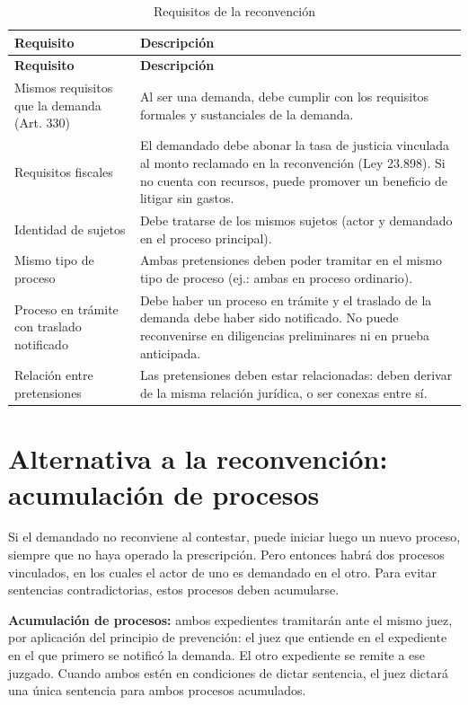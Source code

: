 \documentclass[12pt,oneside]{book}
\begin{document}
\begin{longtable}{p{} p{}}
\caption{Requisitos de la reconvención} \\
\toprule
\textbf{Requisito} & \textbf{Descripción} \\
\midrule
\endfirsthead
\toprule
\textbf{Requisito} & \textbf{Descripción} \\
\midrule
\endhead
Mismos requisitos que la demanda (Art. 330) & Al ser una demanda, debe cumplir con los requisitos formales y sustanciales de la demanda. \\
Requisitos fiscales & El demandado debe abonar la tasa de justicia vinculada al monto reclamado en la reconvención (Ley 23.898). Si no cuenta con recursos, puede promover un beneficio de litigar sin gastos. \\
Identidad de sujetos & Debe tratarse de los mismos sujetos (actor y demandado en el proceso principal). \\
Mismo tipo de proceso & Ambas pretensiones deben poder tramitar en el mismo tipo de proceso (ej.: ambas en proceso ordinario). \\
Proceso en trámite con traslado notificado & Debe haber un proceso en trámite y el traslado de la demanda debe haber sido notificado. No puede reconvenirse en diligencias preliminares ni en prueba anticipada. \\
Relación entre pretensiones & Las pretensiones deben estar relacionadas: deben derivar de la misma relación jurídica, o ser conexas entre sí. \\
\bottomrule
\end{longtable}

\section{Alternativa a la reconvención: acumulación de procesos}

Si el demandado no reconviene al contestar, puede iniciar luego un nuevo proceso, siempre que no haya operado la prescripción. Pero entonces habrá dos procesos vinculados, en los cuales el actor de uno es demandado en el otro. Para evitar sentencias contradictorias, estos procesos deben acumularse.

\begin{important}
\textbf{Acumulación de procesos:} ambos expedientes tramitarán ante el mismo juez, por aplicación del principio de prevención: el juez que entiende en el expediente en el que primero se notificó la demanda. El otro expediente se remite a ese juzgado. Cuando ambos estén en condiciones de dictar sentencia, el juez dictará una única sentencia para ambos procesos acumulados.
\end{important}
\end{document}

